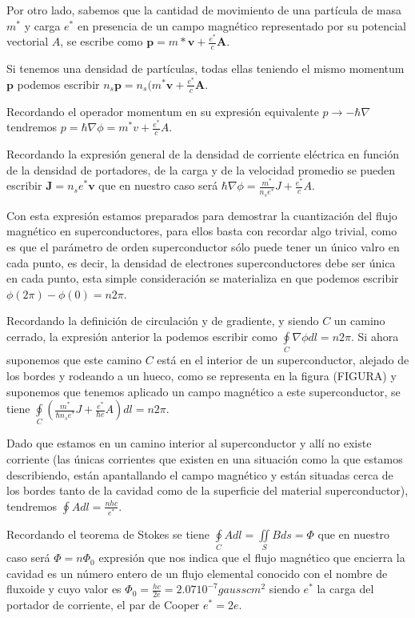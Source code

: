 Por otro lado, sabemos que la cantidad de movimiento de una partícula de masa $m^*$ y carga $e^*$ en presencia de un campo magnético representado por su potencial vectorial $A$, se escribe como $\mathbf{p} = m* \mathbf{v} + \frac{e^*}{c} \mathbf{A}$.

Si tenemos una densidad de partículas, todas ellas teniendo el mismo momentum $\mathbf{p}$ podemos escribir $n_s \mathbf{p} = n_s (m^* \mathbf{v} + \frac{e^*}{c} \mathbf{A}$.

Recordando el operador momentum en su expresión equivalente $p \rightarrow -\hbar \nabla$ tendremos $p = \hbar \nabla \phi = m^* v + \frac{e^*}{c} A$.

Recordando la expresión general de la densidad de corriente eléctrica en función de la densidad de portadores, de la carga y de la velocidad promedio se pueden escribir $\mathbf{J} = n_s e^* \mathbf{v}$ que en nuestro caso será $\hbar \nabla \phi = \frac{m^*}{n_s e^*} J + \frac{e^*}{c} A$.

Con esta expresión estamos preparados para demostrar la cuantización del flujo magnético en superconductores, para ellos basta con recordar algo trivial, como es que el parámetro de orden superconductor sólo puede tener un único valro en cada punto, es decir, la densidad de electrones superconductores debe ser única en cada punto, esta simple consideración se materializa en que podemos escribir $\phi(2\pi) - \phi(0) = n 2 \pi$.

Recordando la definición de circulación y de gradiente, y siendo $C$ un camino cerrado, la expresión anterior la podemos escribir como $\oint\limits_C \nabla \phi dl = n 2 \pi$. Si ahora suponemos que este camino $C$ está en el interior de un superconductor, alejado de los bordes y rodeando a un hueco, como se representa en la figura (FIGURA) y suponemos que tenemos aplicado un campo magnético a este superconductor, se tiene $\oint\limits_C (\frac{m^*}{\hbar n_s e^*} J + \frac{e^*}{\hbar e} A) dl = n 2 \pi$.

Dado que estamos en un camino interior al superconductor y allí no existe corriente (las únicas corrientes que existen en una situación como la que estamos describiendo, están apantallando el campo magnético y están situadas cerca de los bordes tanto de la cavidad como de la superficie del material superconductor), tendremos $\oint A dl = \frac{n h c}{e^*}$.

Recordando el teorema de Stokes se tiene $\oint\limits_C A dl = \iint\limits_S B ds = \Phi$ que en nuestro caso será $\Phi = n \Phi_0$ expresión que nos indica que el flujo magnético que encierra la cavidad es un número entero de un flujo elemental conocido con el nombre de fluxoide y cuyo valor es $\Phi_0 = \frac{h c}{2 e} = 2.07 10^{-7} gauss cm^2$ siendo $e^*$ la carga del portador de corriente, el par de Cooper $e^* = 2e$.

